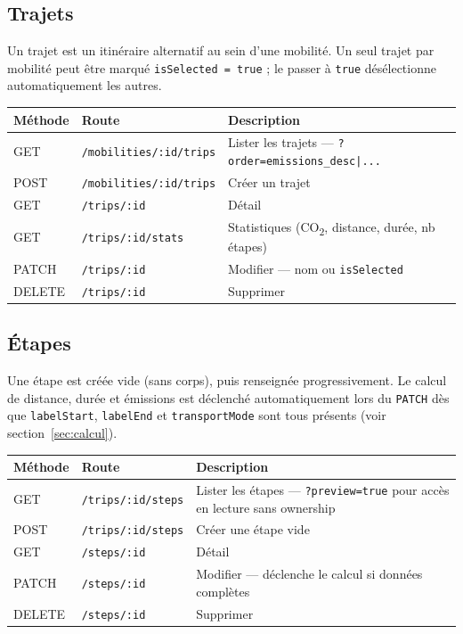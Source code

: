 \documentclass[11pt,a4paper]{article}
\begin{document}
\subsection{Trajets}

Un trajet est un itinéraire alternatif au sein d'une mobilité. Un seul trajet par mobilité peut être marqué \texttt{isSelected = true} ; le passer à \texttt{true} désélectionne automatiquement les autres.

\begin{center}
\begin{tabularx}{\linewidth}{llX}
\toprule
\textbf{Méthode} & \textbf{Route} & \textbf{Description} \\
\midrule
GET    & \texttt{/mobilities/:id/trips} & Lister les trajets — \texttt{?order=emissions\_desc|...} \\
POST   & \texttt{/mobilities/:id/trips} & Créer un trajet \\
GET    & \texttt{/trips/:id}            & Détail \\
GET    & \texttt{/trips/:id/stats}      & Statistiques (CO\textsubscript{2}, distance, durée, nb étapes) \\
PATCH  & \texttt{/trips/:id}            & Modifier — nom ou \texttt{isSelected} \\
DELETE & \texttt{/trips/:id}            & Supprimer \\
\bottomrule
\end{tabularx}
\end{center}

\subsection{Étapes}

Une étape est créée vide (sans corps), puis renseignée progressivement. Le calcul de distance, durée et émissions est déclenché automatiquement lors du \texttt{PATCH} dès que \texttt{labelStart}, \texttt{labelEnd} et \texttt{transportMode} sont tous présents (voir section~\ref{sec:calcul}).

\begin{center}
\begin{tabularx}{\linewidth}{llX}
\toprule
\textbf{Méthode} & \textbf{Route} & \textbf{Description} \\
\midrule
GET    & \texttt{/trips/:id/steps} & Lister les étapes — \texttt{?preview=true} pour accès en lecture sans ownership \\
POST   & \texttt{/trips/:id/steps} & Créer une étape vide \\
GET    & \texttt{/steps/:id}       & Détail \\
PATCH  & \texttt{/steps/:id}       & Modifier — déclenche le calcul si données complètes \\
DELETE & \texttt{/steps/:id}       & Supprimer \\
\bottomrule
\end{tabularx}
\end{center}
\end{document}
